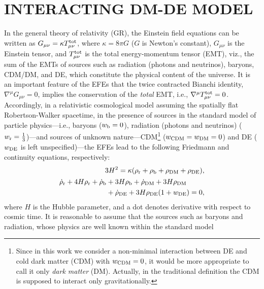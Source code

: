 \documentclass[twocolumn,a4paper,reprint,amssymb,aps,prd,groupedaddress,superscriptaddress,nofootinbib]{revtex4-2}
\begin{document}
\section{INTERACTING DM-DE MODEL}\label{section:ide_model}


In the general theory of relativity (GR), the Einstein field equations can be written as $G_{\mu\nu}=
\kappa T_{\mu\nu}^{\rm tot}$, where $\kappa=8 \pi G$ ($G$ is Newton's constant), $G_{\mu\nu}$ is the Einstein
tensor, and $T_{\mu\nu}^{\rm tot}$ is the total energy-momentum tensor (EMT), viz., the sum of the EMTs
of sources such as radiation (photons and neutrinos), baryons, CDM/DM, and DE, which constitute the physical
content of the universe. It is an important feature of the EFEs that the twice contracted Bianchi
identity, $\nabla^{\mu} G_{\mu\nu}=0$, implies the conservation of the \textit{total} EMT, i.e.,
$\nabla^{\mu} T_{\mu\nu}^{\rm tot}=0$. Accordingly, in a relativistic cosmological model assuming the
spatially flat Robertson-Walker spacetime, in the presence of sources in the standard model of particle
physics---i.e., baryons ($w_{\rm b}=0$), radiation (photons and neutrinos) ($w_{\rm r}=\frac{1}{3}$)---and
sources of unknown nature---CDM\footnote{Since in this work we consider a non-minimal interaction between DE
and cold dark matter (CDM) with $w_{\rm CDM}=0$, it would be more appropriate to call it only
\textit{dark matter} (DM). Actually, in the traditional definition the CDM is supposed to interact
only gravitationally.} ($w_{\rm CDM}=w_{\rm DM}=0$) and DE ($w_{\rm DE}$ is left unspecified)---the
EFEs lead to the following Friedmann and continuity equations, respectively:
%
\begin{align}
    3H^2=\kappa(\rho_{\rm r}+\rho_{\rm b}+\rho_{\rm DM}+\rho_{\rm DE}),\\
    \label{eqn:cont}
\begin{aligned}
    \dot{\rho}_{\rm r}+4H\rho_{\rm r}+\dot{\rho}_{\rm b}&+3H\rho_{\rm b}+\dot{\rho}_{\rm DM}
        +3H\rho_{\rm DM}\\
    &+\dot{\rho}_{\rm DE}+3H\rho_{\rm DE}(1+w_{\rm DE})=0,
\end{aligned}
\end{align}
%
where $H$ is the Hubble parameter, and a dot denotes derivative with respect to cosmic time. It is reasonable to
assume that the sources such as baryons and radiation, whose physics are well known within the standard model
\end{document}
